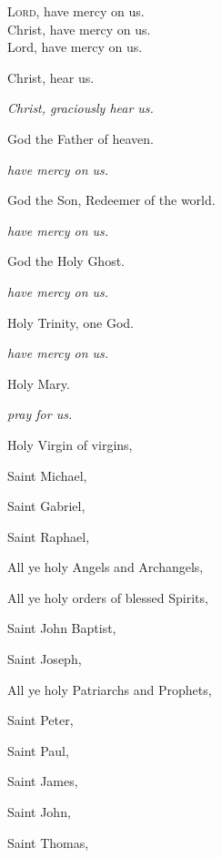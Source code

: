 
\newHymn


\pointorig

\bigskip

\begin{multicols}{2}

\lettrine{L}{ord,} have mercy on us. \\
Christ, have mercy on us. \\
Lord, have mercy on us.\\
\begin{hangparas}{1em}{1}
\parskip0mm
\raggedright
Christ, hear us.                 

{\itshape Christ, graciously hear us.}   

God the Father of heaven.        

{\itshape have mercy on us.}  

God the Son, Redeemer of the world.      

{\itshape have mercy on us.}

God the Holy Ghost.        

{\itshape have mercy on us.}        

Holy Trinity, one God.        

{\itshape have mercy on us.}

Holy Mary.  

{\itshape pray for us.}   


Holy Virgin of virgins,           

Saint Michael,        

Saint Gabriel,       

Saint Raphael,       

All ye holy Angels and Archangels, 

All ye holy orders of blessed Spirits,       

Saint John Baptist,    

Saint Joseph, 

All ye holy Patriarchs and Prophets,    

Saint Peter,  

Saint Paul, 


Saint James,  

Saint John,  

Saint Thomas,   


\end{hangparas}
\end{multicols}
